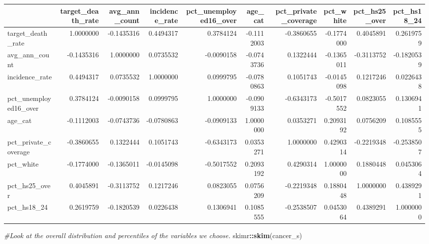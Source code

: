 \documentclass[]{article}
\newenvironment{Shaded}{\begin{snugshade}}{\end{snugshade}}
\newcommand{\KeywordTok}[1]{\textcolor[rgb]{0.13,0.29,0.53}{\textbf{#1}}}
\newcommand{\CommentTok}[1]{\textcolor[rgb]{0.56,0.35,0.01}{\textit{#1}}}
\newcommand{\OperatorTok}[1]{\textcolor[rgb]{0.81,0.36,0.00}{\textbf{#1}}}
\newcommand{\NormalTok}[1]{#1}
\begin{document}
\begin{longtable}[]{@{}lrrrrrrrrr@{}}
\toprule
& target\_death\_rate & avg\_ann\_count & incidence\_rate &
pct\_unemployed16\_over & age\_cat & pct\_private\_coverage & pct\_white
& pct\_hs25\_over & pct\_hs18\_24\tabularnewline
\midrule
\endhead
target\_death\_rate & 1.0000000 & -0.1435316 & 0.4494317 & 0.3784124 &
-0.1112003 & -0.3860655 & -0.1774000 & 0.4045891 &
0.2619759\tabularnewline
avg\_ann\_count & -0.1435316 & 1.0000000 & 0.0735532 & -0.0090158 &
-0.0743736 & 0.1322444 & -0.1365011 & -0.3113752 &
-0.1820539\tabularnewline
incidence\_rate & 0.4494317 & 0.0735532 & 1.0000000 & 0.0999795 &
-0.0780863 & 0.1051743 & -0.0145098 & 0.1217246 &
0.0226438\tabularnewline
pct\_unemployed16\_over & 0.3784124 & -0.0090158 & 0.0999795 & 1.0000000
& -0.0909133 & -0.6343173 & -0.5017552 & 0.0823055 &
0.1306941\tabularnewline
age\_cat & -0.1112003 & -0.0743736 & -0.0780863 & -0.0909133 & 1.0000000
& 0.0353271 & 0.2093192 & 0.0756209 & 0.1085555\tabularnewline
pct\_private\_coverage & -0.3860655 & 0.1322444 & 0.1051743 & -0.6343173
& 0.0353271 & 1.0000000 & 0.4290314 & -0.2219348 &
-0.2538507\tabularnewline
pct\_white & -0.1774000 & -0.1365011 & -0.0145098 & -0.5017552 &
0.2093192 & 0.4290314 & 1.0000000 & 0.1880448 & 0.0453064\tabularnewline
pct\_hs25\_over & 0.4045891 & -0.3113752 & 0.1217246 & 0.0823055 &
0.0756209 & -0.2219348 & 0.1880448 & 1.0000000 &
0.4389291\tabularnewline
pct\_hs18\_24 & 0.2619759 & -0.1820539 & 0.0226438 & 0.1306941 &
0.1085555 & -0.2538507 & 0.0453064 & 0.4389291 &
1.0000000\tabularnewline
\bottomrule
\end{longtable}

\begin{Shaded}
\begin{Highlighting}[]
\CommentTok{#Look at the overall distribution and percentiles of the variables we choose.}
\NormalTok{skimr}\OperatorTok{::}\KeywordTok{skim}\NormalTok{(cancer_s)}
\end{Highlighting}
\end{Shaded}
\end{document}

